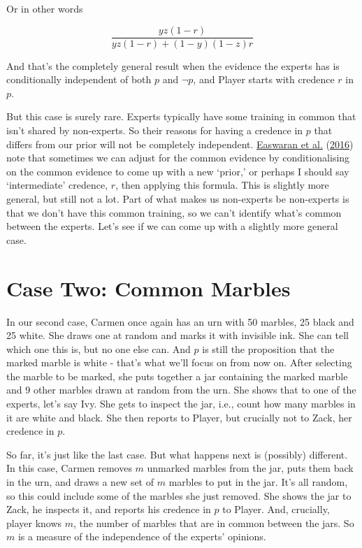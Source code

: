 \documentclass[
  12pt,
]{article}
\begin{document}
Or in other words

\[
\frac{yz(1-r)}{yz(1-r) + (1-y)(1-z)r}
\]

And that's the completely general result when the evidence the experts
has is conditionally independent of both \(p\) and \(\neg p\), and
Player starts with credence \(r\) in \(p\).

But this case is surely rare. Experts typically have some training in
common that isn't shared by non-experts. So their reasons for having a
credence in \(p\) that differs from our prior will not be completely
independent. \protect\hyperlink{ref-EaswaranEtAl2016}{Easwaran et al.}
(\protect\hyperlink{ref-EaswaranEtAl2016}{2016}) note that sometimes we
can adjust for the common evidence by conditionalising on the common
evidence to come up with a new `prior,' or perhaps I should say
`intermediate' credence, \(r\), then applying this formula. This is
slightly more general, but still not a lot. Part of what makes us
non-experts be non-experts is that we don't have this common training,
so we can't identify what's common between the experts. Let's see if we
can come up with a slightly more general case.

\hypertarget{case-two-common-marbles}{%
\section{Case Two: Common Marbles}\label{case-two-common-marbles}}

In our second case, Carmen once again has an urn with 50 marbles, 25
black and 25 white. She draws one at random and marks it with invisible
ink. She can tell which one this is, but no one else can. And \(p\) is
still the proposition that the marked marble is white - that's what
we'll focus on from now on. After selecting the marble to be marked, she
puts together a jar containing the marked marble and 9 other marbles
drawn at random from the urn. She shows that to one of the experts,
let's say Ivy. She gets to inspect the jar, i.e., count how many marbles
in it are white and black. She then reports to Player, but crucially not
to Zack, her credence in \(p\).

So far, it's just like the last case. But what happens next is
(possibly) different. In this case, Carmen removes \(m\) unmarked
marbles from the jar, puts them back in the urn, and draws a new set of
\(m\) marbles to put in the jar. It's all random, so this could include
some of the marbles she just removed. She shows the jar to Zack, he
inspects it, and reports his credence in \(p\) to Player. And,
crucially, player knows \(m\), the number of marbles that are in common
between the jars. So \(m\) is a measure of the independence of the
experts' opinions.
\end{document}
